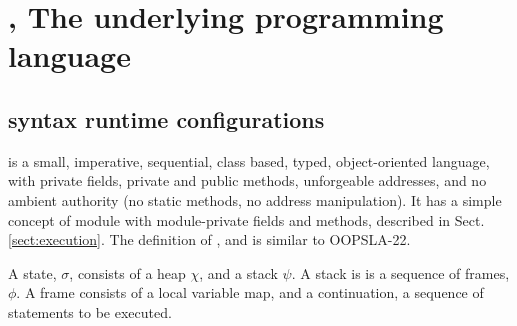 \section{\LangOO, The underlying programming language }  

\subsection{\LangOO syntax runtime configurations}
\label{sub:Loo} 
 \LangOO  is a {small}, imperative, sequential,  class based, typed, object-oriented language,  
 with private fields, private and public methods, unforgeable addresses, and no ambient authority (no static methods, no address manipulation).
 It has a simple concept of module with module-private fields and methods, described in Sect. \ref{sect:execution}.
 The definition of , and is  similar to   OOPSLA-22.

A \LangOO state, $\sigma$,  consists of a  heap $\chi$, and a   stack $\psi$. A stack is is a sequence of frames, $\phi$.
A frame consists of a local variable map, and a continuation, \ie a sequence of statements to be executed.


 

